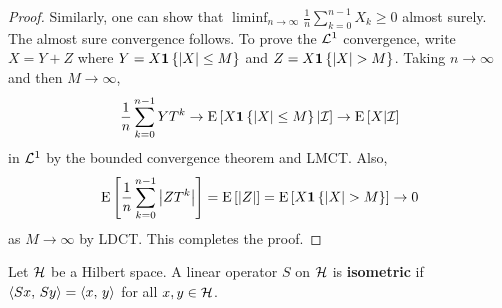 \begin{proof}
    Similarly, one can show that $\liminf_{n\to\infty}\frac{1}{n}\sum_{k=0}^{n-1} X_k\geq 0$ 
    almost surely. The almost sure convergence follows. To prove the 
    $\mathcal{L}^1$ convergence, write $X = Y + Z$ where $Y = X\mathbf{1}\left\{ {\left\lvert {X} \right\rvert\leq M} \right\}$ 
    and $Z = X\mathbf{1}\left\{ {\left\lvert {X} \right\rvert > M} \right\}$. Taking $n\to\infty$ and then $M\to\infty$, 
    \begin{equation*}
        \frac{1}{n}\sum_{k=0}^{n-1}YT^k\to \operatorname{E}\left[ {X\mathbf{1}\left\{ {\left\lvert {X} \right\rvert\leq M} \right\}|\mathcal{I}} \right]\to\operatorname{E}\left[ {X|\mathcal{I}} \right]
    \end{equation*}
    in $\mathcal{L}^1$ by the bounded convergence theorem and LMCT. Also, 
    \begin{equation*}
        \operatorname{E}\left[ {\frac{1}{n}\sum_{k=0}^{n-1}\left\lvert {ZT^k} \right\rvert} \right] = \operatorname{E}\left[ {\left\lvert {Z} \right\rvert} \right] = \operatorname{E}\left[ {X\mathbf{1}\left\{ {\left\lvert {X} \right\rvert>M} \right\}} \right]\to 0
    \end{equation*}  
    as $M\to\infty$ by LDCT. This completes the proof. 
\end{proof}

\begin{definition}
    Let $\mathcal{H}$ be a Hilbert space. A linear operator $S$ on $\mathcal{H}$ is \textbf{isometric} 
    if $\left\langle {Sx},\, {Sy} \right\rangle = \left\langle {x},\, {y} \right\rangle$ for all $x,y\in\mathcal{H}$. 
\end{definition}

